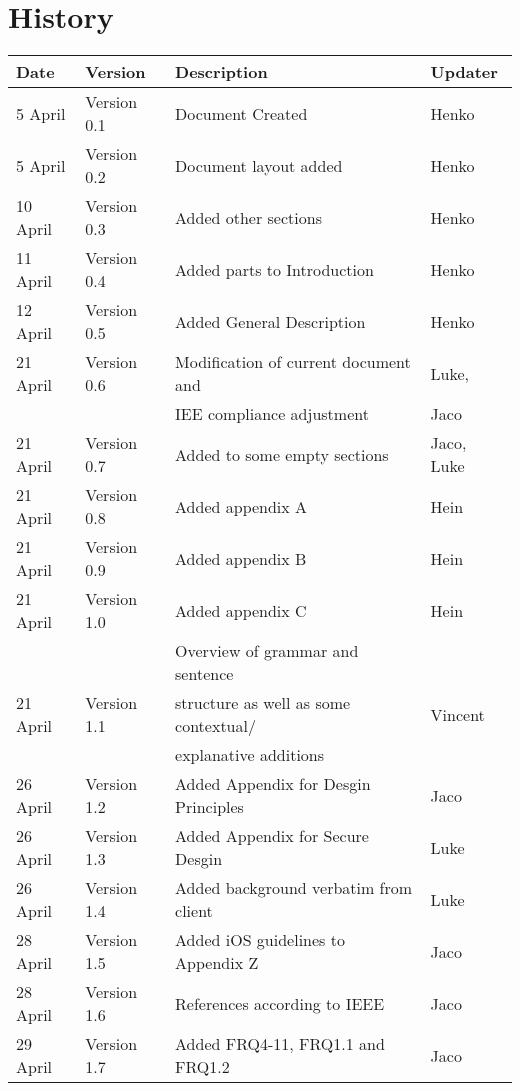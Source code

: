 
\section{History}

\begin{center}

\begin{tabular}{|l|l|l|l|}

\hline
\textbf{Date} & \textbf{Version} & \textbf{Description}&\textbf{Updater}\\ 
\hline
5 April& Version 0.1 & Document Created&Henko\\ 
\hline
5 April& Version 0.2 & Document layout added&Henko\\ 
\hline
10 April & Version 0.3 & Added other sections&Henko\\ 
\hline
11 April & Version 0.4 & Added parts to Introduction&Henko\\ 
\hline
12 April & Version 0.5 & Added General Description&Henko\\ 
\hline
21 April & Version 0.6 & Modification of current document and&Luke,\\
&& IEE compliance adjustment&Jaco\\ 
\hline
21 April & Version 0.7 & Added to some empty sections &Jaco, Luke\\ 
\hline
21 April & Version 0.8 & Added appendix A&Hein\\ 
\hline
21 April & Version 0.9 & Added appendix B&Hein\\ 
\hline
21 April & Version 1.0 & Added appendix C&Hein\\ 
\hline
			&& Overview of grammar and sentence&\\ 
21 April & Version 1.1& structure as well as some contextual/&Vincent\\
			&&explanative additions & \\
\hline
26 April & Version 1.2 & Added Appendix for Desgin Principles& Jaco\\
\hline
26 April & Version 1.3 & Added Appendix for Secure Desgin& Luke\\
\hline
26 April & Version 1.4 & Added background verbatim from client& Luke\\
\hline
28 April & Version 1.5 & Added iOS guidelines to Appendix Z& Jaco\\
\hline
28 April & Version 1.6 & References according to IEEE& Jaco\\
\hline
29 April & Version 1.7 & Added FRQ4-11, FRQ1.1 and FRQ1.2& Jaco\\

\end{tabular}
\end{center}
